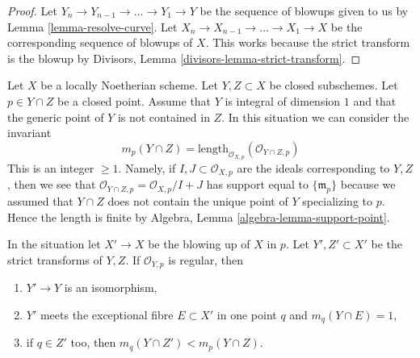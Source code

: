 \begin{proof}
Let $Y_n \to Y_{n - 1} \to \ldots \to Y_1 \to Y$ be the sequence of
blowups given to us by Lemma \ref{lemma-resolve-curve}. Let
$X_n \to X_{n - 1} \to \ldots \to X_1 \to X$ be the corresponding
sequence of blowups of $X$. This works because the strict transform
is the blowup by Divisors, Lemma \ref{divisors-lemma-strict-transform}.
\end{proof}

\noindent
Let $X$ be a locally Noetherian scheme. Let $Y, Z \subset X$ be
closed subschemes. Let $p \in Y \cap Z$ be a closed point. Assume
that $Y$ is integral of dimension $1$ and that the generic point of $Y$
is not contained in $Z$. In this situation we can
consider the invariant
\begin{equation}
\label{equation-multiplicity}
m_p(Y \cap Z) =
\text{length}_{\mathcal{O}_{X, p}}(\mathcal{O}_{Y \cap Z, p})
\end{equation}
This is an integer $\geq 1$. Namely, if $I, J \subset \mathcal{O}_{X, p}$
are the ideals corresponding to $Y, Z$, then we see that
$\mathcal{O}_{Y \cap Z, p} = \mathcal{O}_{X, p}/I + J$
has support equal to $\{\mathfrak m_p\}$ because we assumed that
$Y \cap Z$ does not contain the unique point of $Y$ specializing to $p$.
Hence the length is finite by
Algebra, Lemma \ref{algebra-lemma-support-point}.

\begin{lemma}
\label{lemma-blowup-nonsingular-curves-meeting-at-point}
In the situation let $X' \to X$ be the blowing up of $X$ in $p$.
Let $Y', Z' \subset X'$ be the strict transforms of $Y, Z$.
If $\mathcal{O}_{Y, p}$ is regular, then
\begin{enumerate}
\item $Y' \to Y$ is an isomorphism,
\item $Y'$ meets the exceptional fibre $E \subset X'$ in one point
$q$ and $m_q(Y \cap E) = 1$,
\item if $q \in Z'$ too, then $m_q(Y \cap Z') < m_p(Y \cap Z)$.
\end{enumerate}
\end{lemma}

